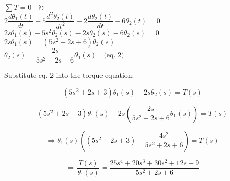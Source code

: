 \documentclass[11pt,letterpaper]{article}
\begin{document}
\begin{center}
\begin{minipage}{.5\textwidth}
\vspace{4pt}
$\sum T = 0 \quad \circlearrowright +$\\

$2\dfrac{d\theta_1(t)}{dt} - 5\dfrac{d^2\theta_2(t)}{dt^2} - 2\dfrac{d\theta_2(t)}{dt} - 6\theta_2(t) = 0$\\

$2s\theta_1(s) - 5s^2\theta_2(s) - 2s\theta_2(s) - 6\theta_2(s) = 0$\\

$2s\theta_1(s) = (5s^2 + 2s + 6)\theta_2(s)$\\

$\theta_2(s) = \dfrac{2s}{5s^2 + 2s + 6}\theta_1(s) \quad \text{(eq. 2)}$
\end{minipage}

\vspace{1em}

Substitute eq. 2 into the torque equation:

\[
(5s^2 + 2s + 3)\theta_1(s) - 2s\theta_2(s) = T(s)
\]

\[
(5s^2 + 2s + 3)\theta_1(s) - 2s\left( \dfrac{2s}{5s^2 + 2s + 6} \theta_1(s) \right) = T(s)
\]

\[
\Rightarrow \theta_1(s) \left( (5s^2 + 2s + 3) - \dfrac{4s^2}{5s^2 + 2s + 6} \right) = T(s)
\]

\[
\Rightarrow \dfrac{T(s)}{\theta_1(s)} = \dfrac{25s^4 + 20s^3 + 30s^2 + 12s + 9}{5s^2 + 2s + 6}
\]

\begin{center}
\end{center}

\end{center}
\end{document}
